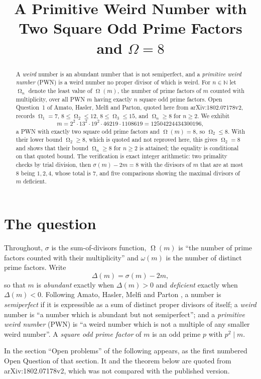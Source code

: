 \documentclass[11pt]{amsart}
\title[A primitive weird number with two square odd prime factors]
{A Primitive Weird Number with Two Square Odd Prime Factors
 and $\Omega=8$}
\date{}
\DeclareMathOperator{\Om}{\Omega}
\newcommand{\sig}{\sigma}
\begin{document}
\begin{abstract}
A \emph{weird} number is an abundant number that is not semiperfect, and a
\emph{primitive weird number} (PWN) is a weird number no proper divisor of
which is weird. For $n\in\mathbb N$ let $\Om_n$ denote the least value of
$\Om(m)$, the number of prime factors of $m$ counted with multiplicity, over
all PWN $m$ having exactly $n$ square odd prime factors. Open Question~1 of
Amato, Hasler, Melfi and Parton, quoted here from arXiv:1802.07178v2, records
$\Om_1=7$, $8\le\Om_2\le12$, $8\le\Om_3\le15$, and $\Om_n\ge8$ for $n\ge2$. We
exhibit
\[
 m=2^2\cdot13^2\cdot19^2\cdot46219\cdot1108619=12504224434300196 ,
\]
a PWN with exactly two square odd prime factors and $\Om(m)=8$, so
$\Om_2\le8$. With their lower bound $\Om_2\ge8$, which is quoted and not
reproved here, this gives $\Om_2=8$ and shows that their bound $\Om_n\ge8$ for
$n\ge2$ is attained; the equality is conditional on that quoted bound. The
verification is exact
integer arithmetic: two primality checks by trial division, then
$\sig(m)-2m=8$ with the divisors of $m$ that are at most $8$ being $1,2,4$,
whose total is $7$, and five comparisons showing the maximal divisors of $m$
deficient.
\end{abstract}

\maketitle

\section{The question}

Throughout, $\sig$ is the sum-of-divisors function, $\Om(m)$ is ``the number
of prime factors counted with their multiplicity'' and $\omega(m)$ is the
number of distinct prime factors. Write
\[
 \Delta(m)=\sig(m)-2m ,
\]
so that $m$ is \emph{abundant} exactly when $\Delta(m)>0$ and
\emph{deficient} exactly when $\Delta(m)<0$. Following Amato, Hasler, Melfi
and Parton \cite{AHMP19}, a number is \emph{semiperfect} if it is
expressible as a sum of distinct proper divisors of itself; a \emph{weird}
number is ``a number which is abundant but not semiperfect''; and a
\emph{primitive weird number} (PWN) is ``a weird number which is not a
multiple of any smaller weird number''. A \emph{square odd prime factor} of
$m$ is an odd prime $p$ with $p^2\mid m$.

In the section ``Open problems'' of \cite{AHMP19} the following appears, as
the first numbered Open Question of that section. It and the theorem below are
quoted from arXiv:1802.07178v2, which was not compared with the published
version.
\end{document}
